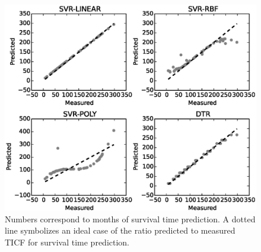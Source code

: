\documentclass{bmcart}
\begin{document}
\begin{backmatter}
\begin{figure}[h!]
  \centering
  \includegraphics{Fig6.eps}
  \caption{
     Numbers correspond to months of survival time
prediction. A dotted line symbolizes an ideal case of the ratio
predicted to measured TICF for survival time prediction.
  }
  \label{figure_6}
\end{figure}




\end{backmatter}
\end{document}
